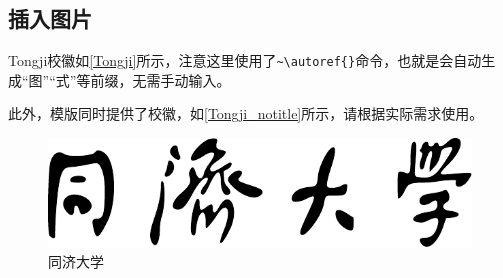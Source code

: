 \documentclass[12pt,hyperref,a4paper,UTF8]{ctexart}
\begin{document}
\subsection{插入图片}
Tongji校徽如\autoref{Tongji}所示，注意这里使用了\verb|~\autoref{}|命令，也就是会自动生成“图”“式”等前缀，无需手动输入。

此外，模版同时提供了校徽，如\autoref{Tongji_notitle}所示，请根据实际需求使用。

\begin{figure}[!htbp]
    \centering
    \includegraphics[width =.5\textwidth]{figures/tongji_logo.pdf}
    \caption{同济大学}
    \label{Tongji}
\end{figure}
\end{document}
